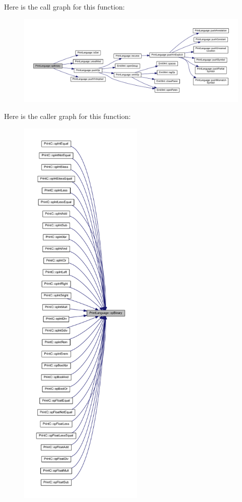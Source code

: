 Here is the call graph for this function\+:
\nopagebreak
\begin{figure}[H]
\begin{center}
\leavevmode
\includegraphics[width=350pt]{class_print_language_a685bceb682b22e22470d649e0d4c3308_cgraph}
\end{center}
\end{figure}
Here is the caller graph for this function\+:
\nopagebreak
\begin{figure}[H]
\begin{center}
\leavevmode
\includegraphics[height=550pt]{class_print_language_a685bceb682b22e22470d649e0d4c3308_icgraph}
\end{center}
\end{figure}
\mbox{\label{class_print_language_a43e714904628588b0dca6b08213b5c9c}} 
